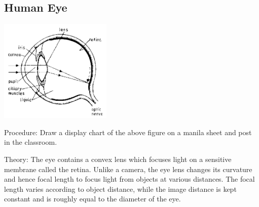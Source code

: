 \begin{multicols}{2}
\subsection{Human Eye}

\begin{center}
\includegraphics[width=0.4\textwidth]{./img/source/human-eye.png}
\end{center}

\begin{description*}
\item[Procedure:]{Draw a display chart of the above figure on a manila sheet and post in the classroom.}
\item[Theory:]{The eye contains a convex lens which focuses light on a sensitive membrane called the retina. Unlike a camera, the eye lens changes its curvature and hence focal length to focus light from objects at various distances. The focal length varies according to object distance, while the image distance is kept constant and is roughly equal to the diameter of the eye.}
\end{description*}



\end{multicols}

\pagebreak